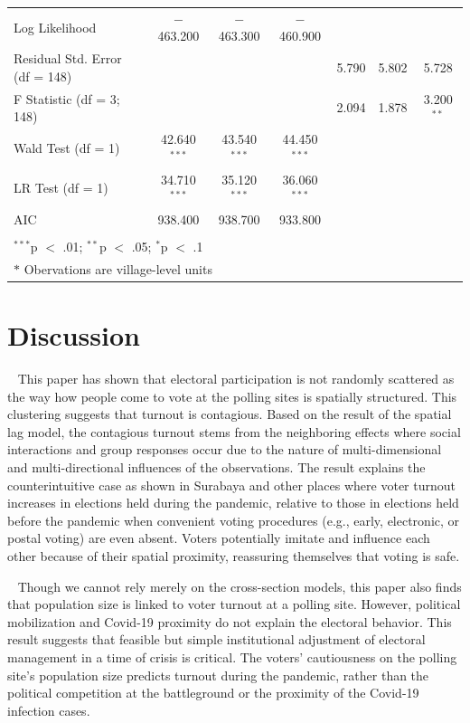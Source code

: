 \documentclass[
  12pt,
]{article}
\begin{document}
\begin{landscape}
\begin{table}[!htbp]
\begin{tabular}{@{\extracolsep{5pt}}lcccccc}
Log Likelihood & $-$463.200 & $-$463.300 & $-$460.900 &  &  &  \\ 
Residual Std. Error (df = 148) &  &  &  & 5.790 & 5.802 & 5.728 \\ 
F Statistic (df = 3; 148) &  &  &  & 2.094 & 1.878 & 3.200$^{**}$ \\ 
Wald Test (df = 1) & 42.640$^{***}$ & 43.540$^{***}$ & 44.450$^{***}$ &  &  &  \\ 
LR Test (df = 1) & 34.710$^{***}$ & 35.120$^{***}$ & 36.060$^{***}$ &  &  &  \\ 
AIC & 938.400 & 938.700 & 933.800 &  &  &  \\ 
\hline \\[-1.8ex] 
\multicolumn{7}{l}{$^{***}$p $<$ .01; $^{**}$p $<$ .05; $^{*}$p $<$ .1} \\ 
\multicolumn{7}{l}{$*$ Obervations are village-level units} \\ 
\end{tabular} 
\end{table} 
\normalsize
\end{landscape}

\hypertarget{discussion}{%
\section{Discussion}\label{discussion}}

~ This paper has shown that electoral participation is not randomly
scattered as the way how people come to vote at the polling sites is
spatially structured. This clustering suggests that turnout is
contagious. Based on the result of the spatial lag model, the contagious
turnout stems from the neighboring effects where social interactions and
group responses occur due to the nature of multi-dimensional and
multi-directional influences of the observations. The result explains
the counterintuitive case as shown in Surabaya and other places where
voter turnout increases in elections held during the pandemic, relative
to those in elections held before the pandemic when convenient voting
procedures (e.g., early, electronic, or postal voting) are even absent.
Voters potentially imitate and influence each other because of their
spatial proximity, reassuring themselves that voting is safe.

~ Though we cannot rely merely on the cross-section models, this paper
also finds that population size is linked to voter turnout at a polling
site. However, political mobilization and Covid-19 proximity do not
explain the electoral behavior. This result suggests that feasible but
simple institutional adjustment of electoral management in a time of
crisis is critical. The voters' cautiousness on the polling site's
population size predicts turnout during the pandemic, rather than the
political competition at the battleground or the proximity of the
Covid-19 infection cases.
\end{document}
